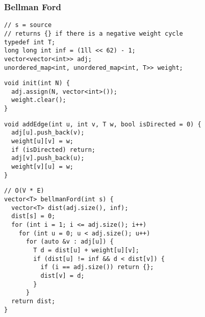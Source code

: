 \documentclass[twoside]{article}
\begin{document}
\begin{multicols*}{2}
\subsubsectionfont{\large\bfseries\sffamily\underline}
\subsubsection*{Bellman Ford}
\begin{verbatim}
// s = source
// returns {} if there is a negative weight cycle
typedef int T;
long long int inf = (1ll << 62) - 1;
vector<vector<int>> adj;
unordered_map<int, unordered_map<int, T>> weight;
\end{verbatim}
\vspace{-12pt}
\begin{verbatim}
void init(int N) {
  adj.assign(N, vector<int>());
  weight.clear();
}
\end{verbatim}
\vspace{-12pt}
\begin{verbatim}
void addEdge(int u, int v, T w, bool isDirected = 0) {
  adj[u].push_back(v);
  weight[u][v] = w;
  if (isDirected) return;
  adj[v].push_back(u);
  weight[v][u] = w;
}
\end{verbatim}
\vspace{-12pt}
\begin{verbatim}
// O(V * E)
vector<T> bellmanFord(int s) {
  vector<T> dist(adj.size(), inf);
  dist[s] = 0;
  for (int i = 1; i <= adj.size(); i++)
    for (int u = 0; u < adj.size(); u++)
      for (auto &v : adj[u]) {
        T d = dist[u] + weight[u][v];
        if (dist[u] != inf && d < dist[v]) {
          if (i == adj.size()) return {};
          dist[v] = d;
        }
      }
  return dist;
}
\end{verbatim}

\subsubsectionfont{\large\bfseries\sffamily\underline}

\end{multicols*}
\end{document}
